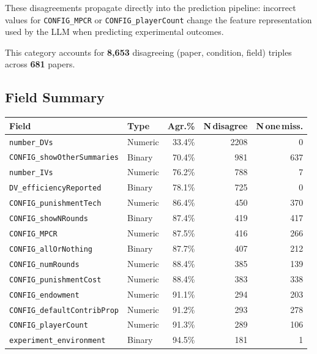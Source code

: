 \documentclass[11pt,a4paper]{article}
\begin{document}
These disagreements propagate directly into the prediction pipeline:
incorrect values for \texttt{CONFIG\_MPCR} or \texttt{CONFIG\_playerCount}
change the feature representation used by the LLM when predicting
experimental outcomes.


        This category accounts for \textbf{8,653} disagreeing
        (paper, condition, field) triples across \textbf{681} papers.

        \subsection{Field Summary}
        \begin{center}\small
\begin{tabular}{llrrr}
\toprule
\textbf{Field} & \textbf{Type} & \textbf{Agr.\%} & \textbf{N\,disagree} & \textbf{N\,one\,miss.}\\
\midrule
\rowcolor{red!18}\texttt{number\_DVs} & Numeric & 33.4\% & 2208 & 0\\
\rowcolor{orange!28}\texttt{CONFIG\_showOtherSummaries} & Binary & 70.4\% & 981 & 637\\
\rowcolor{orange!28}\texttt{number\_IVs} & Numeric & 76.2\% & 788 & 7\\
\rowcolor{orange!28}\texttt{DV\_efficiencyReported} & Binary & 78.1\% & 725 & 0\\
\rowcolor{green!18}\texttt{CONFIG\_punishmentTech} & Numeric & 86.4\% & 450 & 370\\
\rowcolor{green!18}\texttt{CONFIG\_showNRounds} & Binary & 87.4\% & 419 & 417\\
\rowcolor{green!18}\texttt{CONFIG\_MPCR} & Numeric & 87.5\% & 416 & 266\\
\rowcolor{green!18}\texttt{CONFIG\_allOrNothing} & Binary & 87.7\% & 407 & 212\\
\rowcolor{green!18}\texttt{CONFIG\_numRounds} & Numeric & 88.4\% & 385 & 139\\
\rowcolor{green!18}\texttt{CONFIG\_punishmentCost} & Numeric & 88.4\% & 383 & 338\\
\rowcolor{green!18}\texttt{CONFIG\_endowment} & Numeric & 91.1\% & 294 & 203\\
\rowcolor{green!18}\texttt{CONFIG\_defaultContribProp} & Numeric & 91.2\% & 293 & 278\\
\rowcolor{green!18}\texttt{CONFIG\_playerCount} & Numeric & 91.3\% & 289 & 106\\
\rowcolor{green!18}\texttt{experiment\_environment} & Binary & 94.5\% & 181 & 1\\

\end{tabular}
\end{center}
\end{document}
